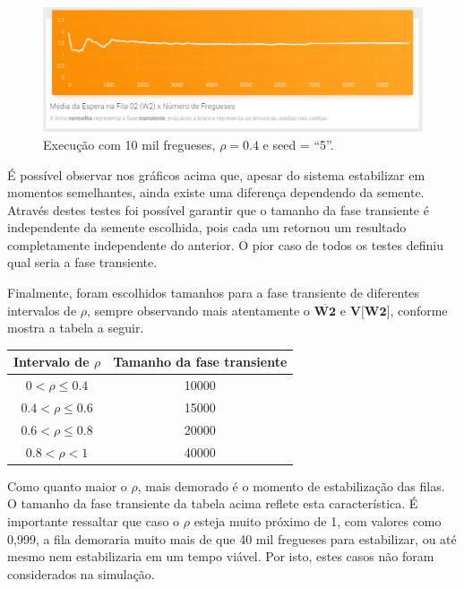 \documentclass[a4paper,12pt]{report}
\begin{document}
\begin{figure}[H]
\includegraphics[width=1\textwidth]{./graficos/transient/transientSeed5.png}
\vspace{-10mm}
\caption{Execução com 10 mil fregueses, $\rho=0.4$ e seed = ``5''.}
\end{figure}
 
É possível observar nos gráficos acima que, apesar do sistema estabilizar em momentos semelhantes, ainda existe uma diferença dependendo da semente. Através destes testes foi possível garantir que o tamanho da fase transiente é independente da semente escolhida, pois cada um retornou um resultado completamente independente do anterior. O pior caso de todos os testes definiu qual seria a fase transiente.

Finalmente, foram escolhidos tamanhos para a fase transiente de diferentes intervalos de $\rho$, sempre observando mais atentamente o $\overline{\textbf{W2}}$ e $\textbf{V[W2]}$, conforme mostra a tabela a seguir.

\begin{center}
\begin{tabular}[H]{ c c }
  \hline
  Intervalo de $\rho$ & Tamanho da fase transiente \\
  \hline
  $0   < \rho \leq 0.4 $  & 10000 \\
  $0.4 < \rho \leq 0.6 $  & 15000 \\
  $0.6 < \rho \leq 0.8 $  & 20000 \\
  $0.8 < \rho < 1 $  & 40000 \\
  \hline
\end{tabular}
\end{center}

Como quanto maior o $\rho$, mais demorado é o momento de estabilização das filas. O tamanho da fase transiente da tabela acima reflete esta característica. É importante ressaltar que caso o $\rho$ esteja muito próximo de 1, com valores como 0,999, a fila demoraria muito mais de que 40 mil fregueses para estabilizar, ou até mesmo nem estabilizaria em um tempo viável. Por isto, estes casos não foram considerados na simulação.
\end{document}

